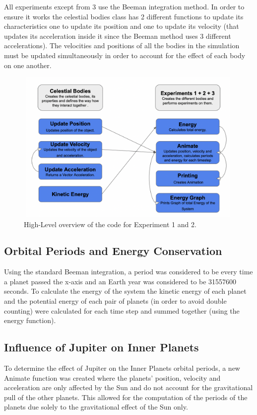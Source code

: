 \documentclass{article}
\begin{document}
{All experiments except from 3 use the Beeman integration method. In order to ensure it works the celestial bodies class has 2 different functions to update its characteristics one to update its position and one to update its velocity (that updates its acceleration inside it since the Beeman method uses 3 different accelerations). The velocities and positions of all the bodies in the simulation must be updated simultaneously in order to account for the effect of each body on one another.  }
\begin{figure}[H]
    \centering
    \includegraphics[width=11.115cm, height=7.455cm]{Experiment 1 .png}
    \caption{High-Level overview of the code for Experiment 1 and 2.}
    \label{fig:my_label}
\end{figure}
\subsection{Orbital Periods and Energy Conservation}

{Using the standard Beeman integration, a period was considered to be every time a planet passed the x-axis and an Earth year was considered to be 31557600 seconds. To calculate the energy of the system the kinetic energy of each planet and the potential energy of each pair of planets (in order to avoid double counting) were calculated for each time step and summed together (using the energy function). }

\subsection{Influence of Jupiter on Inner Planets}

To determine the effect of Jupiter on the Inner Planets orbital periods, a new Animate function was created where the planets' position, velocity and acceleration are only affected by the Sun and do not account for the gravitational pull of the other planets. This allowed for the computation of the periods of the planets due solely to the gravitational effect of the Sun only.
\end{document}
